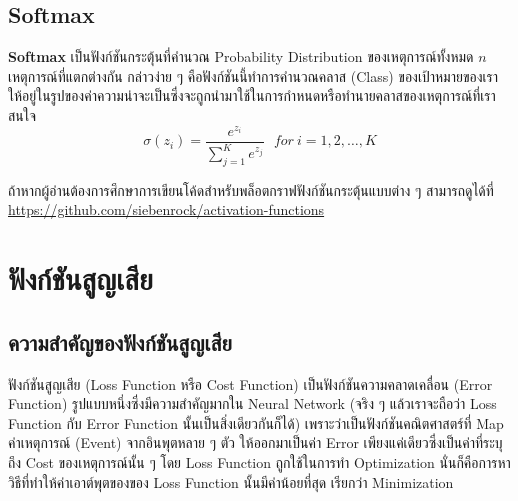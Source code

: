 \subsection{Softmax}

\textbf{Softmax} เป็นฟังก์ชันกระตุ้นที่คำนวณ Probability Distribution ของเหตุการณ์ทั้งหมด $n$ เหตุการณ์ที่แตกต่างกัน กล่าวง่าย ๆ คือฟังก์ชันนี้ทำการคำนวณคลาส (Class) ของเป้าหมายของเราให้อยู่ในรูปของค่าความน่าจะเป็นซึ่งจะถูกนำมาใช้ในการกำหนดหรือทำนายคลาสของเหตุการณ์ที่เราสนใจ
%
\begin{equation}
  \sigma(z_i) = \frac{e^{z_{i}}}{\sum_{j=1}^K e^{z_{j}}} \ \ \ for\ i=1,2,\dots,K
\end{equation}

ถ้าหากผู้อ่านต้องการศึกษาการเขียนโค้ดสำหรับพล็อตกราฟฟังก์ชันกระตุ้นแบบต่าง ๆ สามารถดูได้ที่
\url{https://github.com/siebenrock/activation-functions}

\section{ฟังก์ชันสูญเสีย}
\label{sec:loss_func}

\subsection{ความสำคัญของฟังก์ชันสูญเสีย}
\label{ssec:why_loss_func}

ฟังก์ชันสูญเสีย (Loss Function หรือ Cost Function) เป็นฟังก์ชันความคลาดเคลื่อน (Error Function) รูปแบบหนึ่งซึ่งมีความสำคัญมากใน Neural Network (จริง ๆ แล้วเราจะถือว่า Loss Function กับ Error Function นั้นเป็นสิ่งเดียวกันก็ได้) เพราะว่าเป็นฟังก์ชันคณิตศาสตร์ที่ Map ค่าเหตุการณ์ (Event) จากอินพุตหลาย ๆ ตัว ให้ออกมาเป็นค่า Error เพียงแค่เดียวซึ่งเป็นค่าที่ระบุถึง Cost ของเหตุการณ์นั้น ๆ โดย Loss Function ถูกใช้ในการทำ Optimization นั่นก็คือการหาวิธีที่ทำให้ค่าเอาต์พุตของของ Loss Function นั้นมีค่าน้อยที่สุด เรียกว่า Minimization

